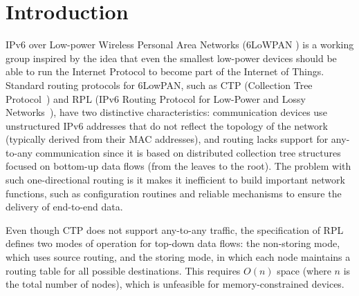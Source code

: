 \section{Introduction}

IPv6 over Low-power Wireless Personal Area Networks
(6LoWPAN
) is a working group
inspired by the idea that even the smallest low-power devices should
be able to run the Internet Protocol to become part of the Internet
of Things. Standard routing protocols for 6LowPAN, such as CTP
(Collection Tree Protocol~\cite{Fonseca:2009}) and RPL (IPv6 Routing
Protocol for Low-Power and Lossy Networks~\cite{rfc6550}), have two
distinctive characteristics: communication devices use unstructured
IPv6 addresses that do not reflect the topology of the network
(typically derived from their MAC addresses), and routing lacks
support for any-to-any communication since it is based on
distributed collection tree structures focused on bottom-up data
flows (from the leaves to the root).
The problem with such one-directional routing is it makes it
inefficient to build important network functions, such as
configuration routines and reliable mechanisms to ensure the
delivery of end-to-end data.

Even though CTP does not support any-to-any traffic, the specification of
RPL defines two modes of operation for top-down data flows: the non-storing
mode, which uses source routing, and the storing mode, in which each node
maintains a routing table for all possible destinations. This requires $O(n)$
space (where $n$ is the total number of nodes), which is unfeasible for
memory-constrained devices. %

